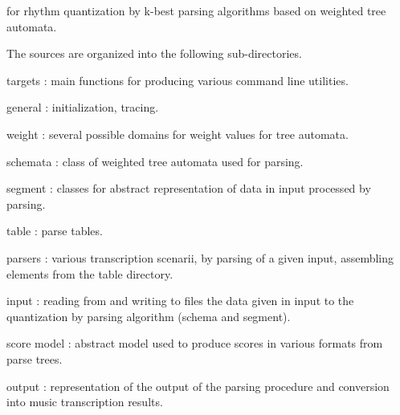 for rhythm quantization by k-\/best parsing algorithms based on weighted tree automata.

The sources are organized into the following sub-\/directories.


\begin{DoxyItemize}
\item targets \+: main functions for producing various command line utilities.
\item general \+: initialization, tracing.
\item weight \+: several possible domains for weight values for tree automata.
\item schemata \+: class of weighted tree automata used for parsing.
\item segment \+: classes for abstract representation of data in input processed by parsing.
\item table \+: parse tables.
\item parsers \+: various transcription scenarii, by parsing of a given {\ttfamily input}, assembling elements from the {\ttfamily table} directory.
\item input \+: reading from and writing to files the data given in input to the quantization by parsing algorithm (schema and segment).
\item score model \+: abstract model used to produce scores in various formats from parse trees.
\item output \+: representation of the output of the parsing procedure and conversion into music transcription results. 
\end{DoxyItemize}